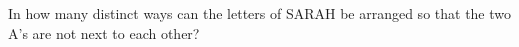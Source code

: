 In how many distinct ways can the letters of SARAH be arranged so that the two A's are not next to each other?
